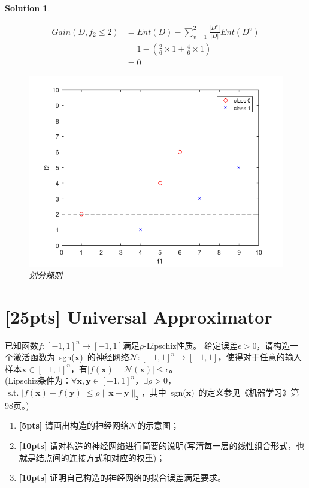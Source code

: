 \documentclass[a4paper,UTF8]{article}
\numberwithin{equation}{section}
\newtheorem*{solution}{Solution}
\begin{document}
\begin{solution}
\begin{enumerate}
\begin{equation}
\begin{aligned}
 Gain(D, f_2\leq 2) &= Ent(D) - \sum_{v=1}^{2}\frac{|D^v|}{|D|}Ent(D^v)\\
 &= 1 - (\frac{2}{6}\times 1 + \frac{4}{6}\times 1)\\
 &= 0
 \end{aligned}
 \end{equation}
 \begin{figure}[!h]
 	\centering   
 	\includegraphics[scale=0.5]{coordinate2.png}  
 	\caption{划分规则} 
 	\label{coordinate2}
 \end{figure}
 \end{enumerate}
 \end{solution}
\newpage

 \section{[25pts] Universal Approximator}
 已知函数$f:[-1, 1]^n \mapsto [-1, 1]$满足$\rho$-Lipschiz性质。 给定误差$\epsilon > 0$，请构造一个激活函数为\mbox{ sgn($\mathbf{x}$) }的神经网络$ \mathcal{N}:[-1,1]^n \mapsto [-1,1] $，使得对于任意的输入样本$ \mathbf{x} \in [-1,1]^n $，有$|f(\mathbf{x}) - \mathcal{N}(\mathbf{x})| \leq \epsilon$。\\
 (Lipschiz条件为：$ \forall \mathbf{x}, \mathbf{y} \in [-1,1]^n$，$ \exists \rho > 0$，$ \mbox{ s.t. } |f(\mathbf{x})-f(\mathbf{y})| \leq \rho \lVert \mathbf{x} - \mathbf{y} \rVert_2 $，其中\mbox{ sgn($\mathbf{x}$) }的定义参见《机器学习》第98页。)
 
  \begin{enumerate}[ {(}1{)}]
 	\item \textbf{[5pts]} 请画出构造的神经网络$\mathcal{N}$的示意图；
 	
 	\item \textbf{[10pts]} 请对构造的神经网络进行简要的说明(写清每一层的线性组合形式，也就是结点间的连接方式和对应的权重)；
 	
 	\item \textbf{[10pts]} 证明自己构造的神经网络的拟合误差满足要求。
 \end{enumerate}
\end{document}
